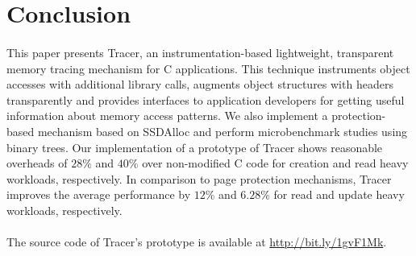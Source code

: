 \section{Conclusion}
\label{sec:conclusion}

\paragraph{}
This paper presents Tracer, an instrumentation-based lightweight, transparent memory tracing mechanism for C applications. This technique instruments object accesses with additional library calls, augments object structures with headers transparently and provides interfaces to application developers for getting useful information about memory access patterns. We also implement a protection-based mechanism based on SSDAlloc \cite{SSDAlloc} and perform microbenchmark studies using binary trees. Our implementation of a prototype of Tracer shows reasonable overheads of $28\%$ and $40\%$ over non-modified C code for creation and read heavy workloads, respectively. In comparison to page protection mechanisms, Tracer improves the average performance by $12\%$ and $6.28\%$ for read and update heavy workloads, respectively.
\paragraph{}
The source code of Tracer's prototype is available at \url{http://bit.ly/1gvF1Mk}.
